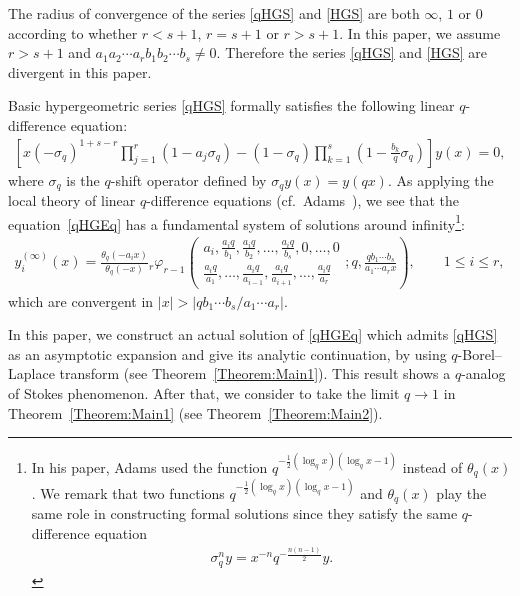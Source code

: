 \documentclass[11pt]{article}
\numberwithin{equation}{section}
\begin{document}
The radius of convergence of the series \eqref{qHGS} and \eqref{HGS} are both $\infty$, $1$ or $0$ according to whether $r<s+1$, $r=s+1$ or $r>s+1$. In this paper, we assume $r>s+1$ and $a_1a_2\cdots a_rb_1b_2\cdots b_s\neq0$. Therefore the series \eqref{qHGS} and \eqref{HGS} are divergent in this paper.

Basic hypergeometric series \eqref{qHGS} formally satisfies the following linear $q$-difference equation:
\begin{gather}\label{qHGEq}
\left[x(-\sigma_q)^{1+s-r}\prod_{j=1}^r(1-a_j\sigma_q)-(1-\sigma_q)\prod_{k=1}^s\left(1-\frac{b_k}{q}\sigma_q\right)\right]y(x)=0,
\end{gather}
where $\sigma_q$ is the $q$-shift operator defined by $\sigma_qy(x)=y(qx)$. As applying the local theory of linear $q$-difference equations (cf.\ Adams~\cite{Adams1929}), we see that the equation~\eqref{qHGEq} has a fundamental system of solutions around infinity\footnote{In his paper, Adams used the function $q^{-\frac{1}{2}(\log_q x)(\log_q x-1)}$ instead of $\theta_q(x)$. We remark that two functions $q^{-\frac{1}{2}(\log_q x)(\log_q x-1)}$ and $\theta_q(x)$ play the same role in constructing formal solutions since they satisfy the same $q$-difference equation
\begin{gather*}
\sigma_q^n y=x^{-n}q^{-\frac{n(n-1)}{2}}y.
\end{gather*}}:
\begin{gather}\label{qHGEq_Sol}
y_i^{(\infty)}(x)=\frac{\theta_q(-a_ix)}{\theta_q(-x)}{}_{r}\varphi_{r-1}
\left(\begin{matrix}
a_i,\frac{a_iq}{b_1},\frac{a_iq}{b_2},\ldots,\frac{a_iq}{b_s},0,\ldots,0\\
\frac{a_iq}{a_1},\ldots,\frac{a_iq}{a_{i-1}},\frac{a_iq}{a_{i+1}},\ldots,\frac{a_iq}{a_r}
\end{matrix};q,\frac{qb_1\cdots b_s}{a_1\cdots a_rx}\right),\qquad\!\! 1\le i\le r,\!\!\!
\end{gather}
which are convergent in $\vert x\vert>\vert qb_1\cdots b_s/a_1\cdots a_r\vert$.

In this paper, we construct an actual solution of \eqref{qHGEq} which admits \eqref{qHGS} as an asymptotic expansion and give its analytic continuation, by using $q$-Borel--Laplace transform (see Theorem~\ref{Theorem:Main1}). This result shows a $q$-analog of Stokes phenomenon. After that, we consider to take the limit $q\to1$ in Theorem~\ref{Theorem:Main1} (see Theorem~\ref{Theorem:Main2}).
\end{document}
